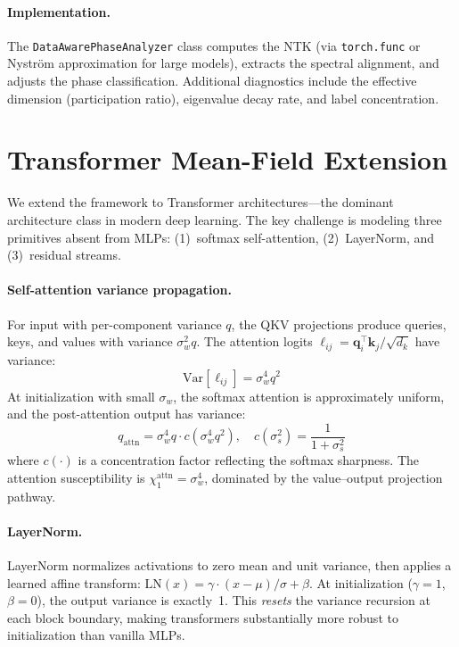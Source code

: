 \documentclass[10pt]{article}
\newcommand{\Var}{\mathrm{Var}}
\begin{document}
\paragraph{Implementation.}
The \texttt{DataAwarePhaseAnalyzer} class computes the NTK (via \texttt{torch.func} or Nystr\"om approximation for large models), extracts the spectral alignment, and adjusts the phase classification.
Additional diagnostics include the effective dimension (participation ratio), eigenvalue decay rate, and label concentration.

\section{Transformer Mean-Field Extension}
\label{sec:transformer}

We extend the framework to Transformer architectures---the dominant architecture class in modern deep learning.
The key challenge is modeling three primitives absent from MLPs: (1)~softmax self-attention, (2)~LayerNorm, and (3)~residual streams.

\paragraph{Self-attention variance propagation.}
For input with per-component variance $q$, the QKV projections produce queries, keys, and values with variance $\sigma_w^2 q$.
The attention logits $\ell_{ij} = \mathbf{q}_i^\top \mathbf{k}_j / \sqrt{d_k}$ have variance:
\begin{equation}
    \Var[\ell_{ij}] = \sigma_w^4 q^2
    \label{eq:attn-logit-var}
\end{equation}
At initialization with small $\sigma_w$, the softmax attention is approximately uniform, and the post-attention output has variance:
\begin{equation}
    q_{\text{attn}} = \sigma_w^4 q \cdot c(\sigma_w^4 q^2), \quad c(\sigma_s^2) = \frac{1}{1 + \sigma_s^2}
    \label{eq:attn-output-var}
\end{equation}
where $c(\cdot)$ is a concentration factor reflecting the softmax sharpness.
The attention susceptibility is $\chi_1^{\text{attn}} = \sigma_w^4$, dominated by the value--output projection pathway.

\paragraph{LayerNorm.}
LayerNorm normalizes activations to zero mean and unit variance, then applies a learned affine transform:
$\text{LN}(x) = \gamma \cdot (x - \mu) / \sigma + \beta$.
At initialization ($\gamma = 1$, $\beta = 0$), the output variance is exactly~1.
This \emph{resets} the variance recursion at each block boundary, making transformers substantially more robust to initialization than vanilla MLPs.
\end{document}
